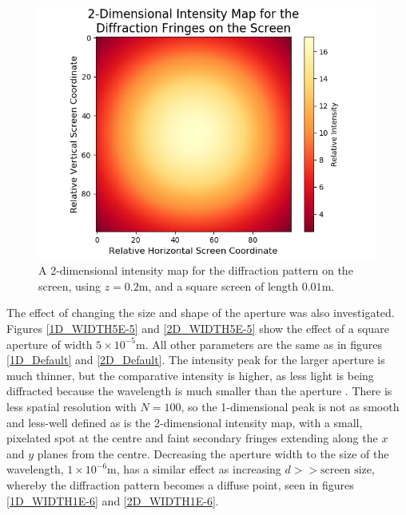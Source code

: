 \documentclass[twocolumn,prl,nobalancelastpage,aps,10pt]{revtex4-1}
\begin{document}
\begin{figure}
	\includegraphics*[width=0.96\linewidth,clip]{2D_z20cm}
	\caption{A 2-dimensional intensity map for the diffraction pattern on the screen, using $z = 0.2$m, and a square screen of length $0.01$m.} \label{2D_z20cm}
\end{figure}


The effect of changing the size and shape of the aperture was also investigated. Figures \ref{1D_WIDTH5E-5} and \ref{2D_WIDTH5E-5} show the effect of a square aperture of width  $5\times10^{-5}$m. All other parameters are the same as in figures \ref{1D_Default} and \ref{2D_Default}. The intensity peak for the larger aperture is much thinner, but the comparative intensity is higher, as less light is being diffracted because the wavelength is much smaller than the aperture \cite{Hecht2002}. There is less spatial resolution with $N=100$, so the 1-dimensional peak is not as smooth and less-well defined as is the 2-dimensional intensity map, with a small, pixelated spot at the centre and faint secondary fringes extending along the $x$ and $y$ planes from the centre. Decreasing the aperture width to the size of the wavelength, $1\times10^{-6}$m, has a similar effect as increasing $d>>\text{screen size}$, whereby the diffraction pattern becomes a diffuse point, seen in figures \ref{1D_WIDTH1E-6} and \ref{2D_WIDTH1E-6}.
\end{document}
